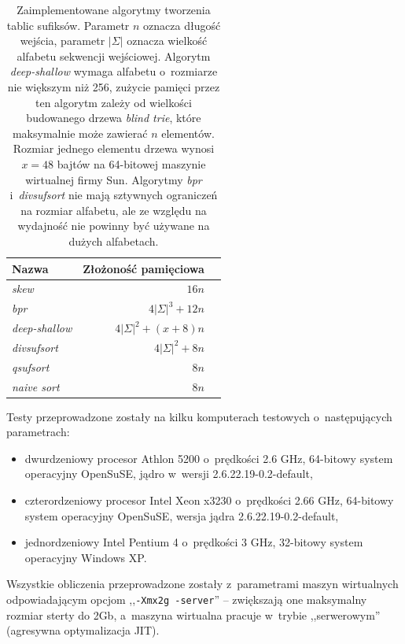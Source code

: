 \begin{table}[ht]
    \begin{center}        
        \begin{tabular}{l r r}
         \toprule
            Nazwa & Złożoność pamięciowa \\
         \midrule
            \emph{skew} & $16n$  \\
            \emph{bpr} & $4|\Sigma|^3+12n$ \\ 
            \emph{deep-shallow} & $4|\Sigma|^2+(x+8)n$  \\
            \emph{divsufsort} & $4|\Sigma|^2+8n$ \\
            \emph{qsufsort} & $8n$ \\
            \emph{naive sort} & $8n$ \\
        \bottomrule
        \end{tabular}
    \end{center}                         
    \caption{Zaimplementowane algorytmy tworzenia tablic sufiksów. Parametr $n$ oznacza długość wejścia, 
    parametr $|\Sigma|$ oznacza wielkość alfabetu sekwencji wejściowej. Algorytm \emph{deep-shallow} wymaga
    alfabetu o~rozmiarze nie większym niż 256, zużycie pamięci przez ten 
    algorytm zależy od wielkości budowanego drzewa \emph{blind trie}, które maksymalnie może zawierać $n$ elementów. Rozmiar jednego elementu drzewa wynosi $x=48$ bajtów na 64-bitowej maszynie wirtualnej firmy Sun.
    Algorytmy \emph{bpr} i~\emph{divsufsort} nie mają sztywnych ograniczeń na rozmiar 
    alfabetu, ale ze względu na wydajność nie powinny być używane na dużych alfabetach.}%
    \label{tab:alg-impl}
\end{table}
	
\noindent
Testy przeprowadzone zostały na kilku komputerach testowych o~następujących parametrach:
\begin{itemize}
    \item dwurdzeniowy procesor Athlon 5200 o~prędkości 2.6 GHz, 64-bitowy system operacyjny OpenSuSE, jądro w~wersji 2.6.22.19-0.2-default,
    \item czterordzeniowy procesor Intel Xeon x3230 o~prędkości 2.66 GHz, 64-bitowy system operacyjny OpenSuSE, wersja jądra 2.6.22.19-0.2-default,
    \item jednordzeniowy Intel Pentium 4 o~prędkości 3 GHz, 32-bitowy system operacyjny Windows XP.
\end{itemize}
	
\noindent
Wszystkie obliczenia przeprowadzone zostały z~parametrami maszyn wirtualnych
odpowiadającym opcjom ,,\texttt{-Xmx2g -server}'' -- zwiększają one maksymalny rozmiar 
sterty do 2Gb, a~maszyna wirtualna pracuje w~trybie ,,serwerowym'' (agresywna optymalizacja JIT).
	
